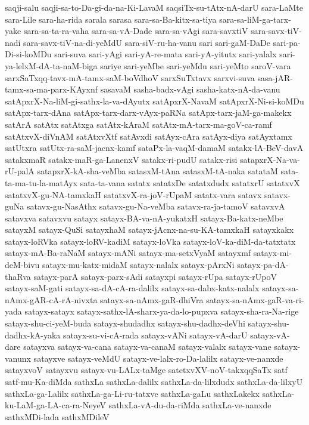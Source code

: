 {saqji-salu
saqji-sa-to-Da-gi-da-na-Ki-LavaM
saqsiTx-su-tAtx-nA-darU
sara-LaMte
sara-Lile
sara-ha-rida
sarala
sarasa
sara-sa-Ba-kitx-sa-tiya
sara-sa-liM-ga-tarx-yake
sara-sa-ta-ra-vaha
sara-sa-vA-Dade
sara-sa-vAgi
sara-savxtiV
sara-savx-tiV-nadi
sara-savx-tiV-na-di-yeMdU
sara-siV-ru-ha-vanu
sari
sari-gaM-DaDe
sari-pa-Di-si-koMDu
sari-suva
sari-yAgi
sari-yA-re-mata
sari-yA-yitutx
sari-yalalx
sari-ya-lelxM-dA-ta-naM-biga
sariye
sari-yeMbe
sari-yeMdu
sari-yeMto
saroV-vara
sarxSaTxqq-tavx-mA-tamx-saM-boVdhoV
sarxSuTxtavx
sarxvi-suva
sasa-jAR-tamx-sa-ma-parx-KAyxnf
sasavaM
sasha-badx-vAgi
sasha-katx-nA-da-vanu
satApxrX-Na-liM-gi-sathx-la-va-dAyutx
satApxrX-NavaM
satApxrX-Ni-si-koMDu
satApx-tarx-dAna
satApx-tarx-darx-vAyx-paRNa
satApx-tarx-jaM-ga-makekx
satArA
satAtx
satAtxga
satAtx-kAraM
satAtx-mA-tarx-ma-goV-ca-ramf
satAtxvX-diVnAM
satAtxvXtf
satAvxdi
satAyx-cAra
satAyx-diya
satAyxtamx
satUtxra
satUtx-ra-saM-jacnx-kamf
sataPx-la-vaqM-damaM
satakx-lA-BeV-davA
satakxmaR
satakx-maR-ga-LanenxV
satakx-ri-pudU
satakx-risi
satapxrX-Na-va-rU-palA
satapxrX-kA-sha-veMba
satasxM-tAna
satasxM-tA-naka
satataM
sata-ta-ma-tu-la-matAyx
sata-ta-vana
satatx
satatxDe
satatxdudx
satatxrU
satatxvX
satatxvX-gu-NA-tamxkaH
satatxvX-ra-joV-rUpaM
satatx-vara
satavx
satavx-guNa
satavx-gu-NasAthx
satavx-gu-Na-veMba
satavx-ra-ja-tamoV
satavxvA
satavxva
satavxvu
satayx
satayx-BA-va-nA-yukatxH
satayx-Ba-katx-neMbe
satayxM
satayx-QuSi
satayxhaM
satayx-jAcnx-na-su-KA-tamxkaH
satayxkakx
satayx-loRVka
satayx-loRV-kadiM
satayx-loVka
satayx-loV-ka-diM-da-tatxtatx
satayx-mA-Ba-raNaM
satayx-mANi
satayx-ma-setxVyaM
satayxmf
satayx-mi-deM-bivu
satayx-mu-katx-midaM
satayx-nalalx
satayx-pArxNi
satayx-pa-dA-thaRva
satayx-parA
satayx-parx-sAdi
satayxpi
satayx-rUpa
satayx-rUpoV
satayx-saM-gati
satayx-sa-dA-cA-ra-dalilx
satayx-sa-dabx-katx-nalalx
satayx-sa-nAmx-gAR-cA-rA-nivxta
satayx-sa-nAmx-gaR-dhiVra
satayx-sa-nAmx-gaR-va-ri-yada
satayx-satayx
satayx-sathx-lA-sharx-ya-da-lo-pupxva
satayx-sha-ra-Na-rige
satayx-shu-ci-yeM-buda
satayx-shudadhx
satayx-shu-dadhx-deVhi
satayx-shu-dadhx-kA-yaka
satayx-su-vi-cA-rada
satayx-vANi
satayx-vA-darU
satayx-vA-dare
satayxva
satayx-va-cana
satayx-va-canaM
satayx-valalx
satayx-vane
satayx-vanunx
satayxve
satayx-veMdU
satayx-ve-lalx-ro-Da-lalilx
satayx-ve-nanxde
satayxvoV
satayxvu
satayx-vu-LALx-taMge
satetxvXV-noV-takxqqSaTx
satf
satf-mu-Ka-diMda
sathxLa
sathxLa-dalilx
sathxLa-da-lilxdudx
sathxLa-da-lilxyU
sathxLa-ga-Lalilx
sathxLa-ga-Li-ru-tatxve
sathxLa-gaLu
sathxLakekx
sathxLa-ku-LaM-ga-LA-ca-ra-NeyeV
sathxLa-vA-du-da-riMda
sathxLa-ve-nanxde
sathxMDi-lada
sathxMDileV
}
